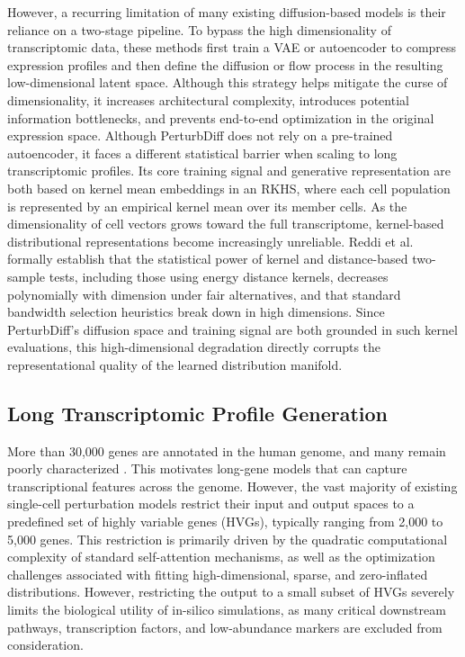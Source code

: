\documentclass[11pt]{article}
\begin{document}
However, a recurring limitation of many existing diffusion-based models is their reliance on a two-stage pipeline. To bypass the high dimensionality of transcriptomic data, these methods first train a VAE or autoencoder to compress expression profiles and then define the diffusion or flow process in the resulting low-dimensional latent space. Although this strategy helps mitigate the curse of dimensionality, it increases architectural complexity, introduces potential information bottlenecks, and prevents end-to-end optimization in the original expression space. Although PerturbDiff does not rely on a pre-trained autoencoder, it faces a different statistical barrier when scaling to long transcriptomic profiles. Its core training signal and generative representation are both based on kernel mean embeddings in an RKHS, where each cell population is represented by an empirical kernel mean over its member cells. As the dimensionality of cell vectors grows toward the full transcriptome, kernel-based distributional representations become increasingly unreliable. Reddi et al.~\cite{ramdas2015decreasing} formally establish that the statistical power of kernel and distance-based two-sample tests, including those using energy distance kernels, decreases polynomially with dimension under fair alternatives, and that standard bandwidth selection heuristics break down in high dimensions. Since PerturbDiff's diffusion space and training signal are both grounded in such kernel evaluations, this high-dimensional degradation directly corrupts the representational quality of the learned distribution manifold.

\subsection{Long Transcriptomic Profile Generation}
More than 30,000 genes are annotated in the human genome, and many remain poorly characterized \cite{mudge2025gencode}. This motivates long-gene models that can capture transcriptional features across the genome. However, the vast majority of existing single-cell perturbation models restrict their input and output spaces to a predefined set of highly variable genes (HVGs), typically ranging from 2,000 to 5,000 genes. This restriction is primarily driven by the quadratic computational complexity of standard self-attention mechanisms, as well as the optimization challenges associated with fitting high-dimensional, sparse, and zero-inflated distributions. However, restricting the output to a small subset of HVGs severely limits the biological utility of in-silico simulations, as many critical downstream pathways, transcription factors, and low-abundance markers are excluded from consideration.
\end{document}
